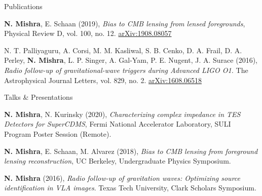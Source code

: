 \documentclass{resume} %
\begin{document}
\newpage

\begin{rSection}{Publications}

\textbf{N. Mishra}, E. Schaan (2019), \textit{Bias to CMB lensing from lensed foregrounds}, Physical Review D, vol. 100, no. 12. \href{https://arxiv.org/abs/1908.08057}{arXiv:1908.08057}

N. T. Palliyaguru, A. Corsi, M. M. Kasliwal, S. B. Cenko, D. A. Frail, D. A. Perley, \textbf{N. Mishra}, L. P. Singer, A. Gal-Yam, P. E. Nugent, J. A. Surace (2016),  \textit{Radio follow-up of gravitational-wave triggers during Advanced LIGO O1.} The Astrophysical Journal Letters, vol. 829, no. 2. \href{https://arxiv.org/abs/1608.06518}{arXiv:1608.06518}


\end{rSection}


\begin{rSection}{Talks \& Presentations}

\textbf{N. Mishra}, N. Kurinsky (2020), \textit{Characterizing complex impedance in TES Detectors for SuperCDMS}, Fermi National Accelerator Laboratory, SULI Program Poster Session (Remote).


\textbf{N. Mishra}, E. Schaan, M. Alvarez (2018), \textit{Bias to CMB lensing from foreground lensing reconstruction}, UC Berkeley, Undergraduate Physics Symposium.

\textbf{N. Mishra} (2016), \textit{Radio follow-up of gravitation waves: Optimizing source identification in VLA images}. Texas Tech University, Clark Scholars Symposium.

\end{rSection}
\end{document}
